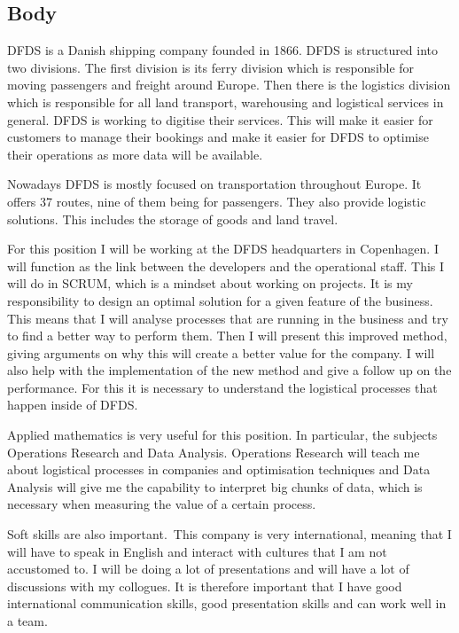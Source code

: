 \documentclass[titlepage]{article}
\begin{document}
\subsection{Body}

DFDS is a Danish shipping company founded in 1866. DFDS is structured into two
divisions. The first division is its ferry division which is responsible for
moving passengers and freight around Europe.  Then there is the logistics
division which is responsible for all land transport, warehousing and
logistical services in general. DFDS is working to digitise their services.
This will make it easier for customers to manage their bookings and make it
easier for DFDS to optimise their operations as more data will be available.

Nowadays DFDS is mostly focused on transportation throughout Europe. It offers
37 routes, nine of them being for passengers. They also provide logistic solutions.
This includes the storage of goods and land travel.

For this position I will be working at the DFDS headquarters in Copenhagen. I will
function as the link between the developers and the operational staff. This I
will do in SCRUM, which is a mindset about working on projects. It is my
responsibility to design an optimal solution for a given feature of the
business. This means that I will analyse processes that are running in the
business and try to find a better way to perform them. Then I will present
this improved method, giving arguments on why this will create a better value for
the company. I will also help with the implementation of the new method and
give a follow up on the performance. For this it is necessary to understand
the logistical processes that happen inside of DFDS.

Applied mathematics is very useful for this position. In particular, the
subjects Operations Research and Data Analysis. Operations Research 
will teach me about logistical processes in companies and optimisation
techniques and Data Analysis will give me the capability to interpret
big chunks of data, which is necessary when measuring the value of a certain
process.

Soft skills are also important. This company is very international, meaning
that I will have to speak in English and interact with cultures that I am not
accustomed to. I will be doing a lot of presentations and will have a lot of
discussions with my collogues. It is therefore important that I have good
international communication skills, good presentation skills and can work well in a team.
\end{document}

